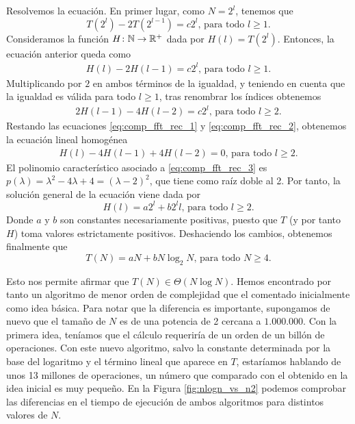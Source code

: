 \documentclass{article}
\begin{document}
Resolvemos la ecuación. En primer lugar, como $N = 2^l$, tenemos que
\[ T(2^l) - 2T(2^{l-1})=c2^l \text{, para todo } l \ge 1.\]
Consideramos la función $H\colon \mathbb{N} \to \mathbb{R}^+$ dada por $H(l) = T(2^l)$. Entonces, la ecuación anterior queda como
\begin{align} \label{eq:comp_fft_rec_1}
 H(l) - 2H(l-1) = c2^l \text{, para todo } l \ge 1.
\end{align}
Multiplicando por $2$ en ambos términos de la igualdad, y teniendo en cuenta que la igualdad es válida para todo $l \ge 1$, tras renombrar los índices obtenemos
\begin{align} \label{eq:comp_fft_rec_2}
 2H(l-1) - 4H(l-2) = c2^l \text{, para todo } l \ge 2.
\end{align}
Restando las ecuaciones \ref{eq:comp_fft_rec_1} y \ref{eq:comp_fft_rec_2}, obtenemos la ecuación lineal homogénea
\begin{align} \label{eq:comp_fft_rec_3}
 H(l) - 4H(l-1) + 4H(l-2) = 0 \text{, para todo } l \ge 2.
\end{align}
El polinomio característico asociado a \ref{eq:comp_fft_rec_3} es $p(\lambda) = \lambda^2 - 4\lambda + 4 = (\lambda -2)^2$, que tiene como raíz doble al 2. Por tanto, la solución general de la ecuación viene dada por
\[ H(l)= a2^l + b2^ll \text{, para todo } l \ge 2.\]
Donde $a$ y $b$ son constantes necesariamente positivas, puesto que $T$ (y por tanto $H$) toma valores estrictamente positivos. Deshaciendo los cambios, obtenemos finalmente que
\[ T(N) = aN + bN\log_2N \text{, para todo } N \ge 4. \]

Esto nos permite afirmar que $T(N) \in \Theta(N\log N)$. Hemos encontrado por tanto un algoritmo de menor orden de complejidad que el comentado inicialmente como idea básica. Para notar que la diferencia es importante, supongamos de nuevo que el tamaño de $N$ es de una potencia de 2 cercana a $1.000.000$. Con la primera idea, teníamos que el cálculo requeriría de un orden de un billón de operaciones. Con este nuevo algoritmo, salvo la constante determinada por la base del logaritmo y el término lineal que aparece en $T$, estaríamos hablando de unos 13 millones de operaciones, un número que comparado con el obtenido en la idea inicial es muy pequeño. En la Figura \ref{fig:nlogn_vs_n2} podemos comprobar las diferencias en el tiempo de ejecución de ambos algoritmos para distintos valores de $N$.
\end{document}
